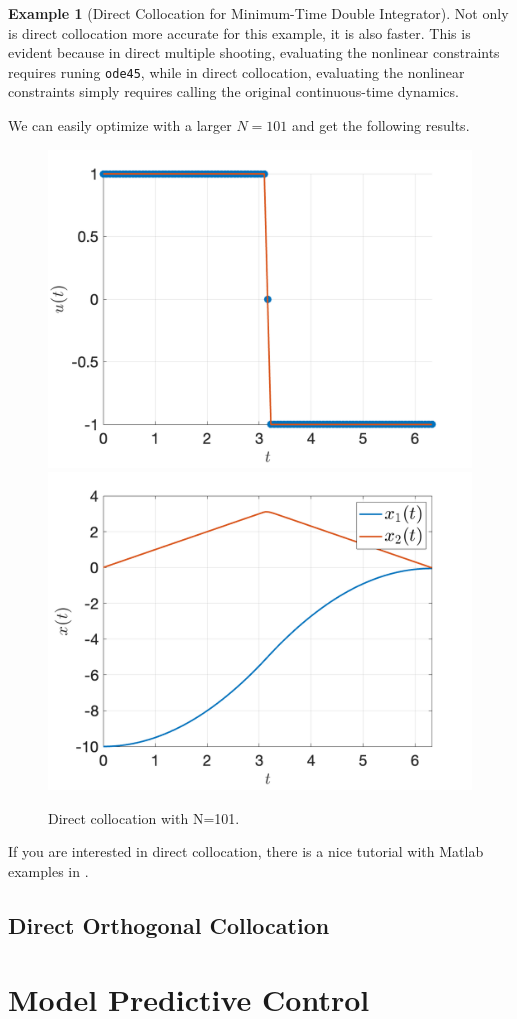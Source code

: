 \documentclass[
]{book}
\theoremstyle{definition}
\theoremstyle{definition}
\newtheorem{example}{Example}[chapter]
\theoremstyle{definition}
\theoremstyle{definition}
\theoremstyle{remark}
\begin{document}
\begin{example}[Direct Collocation for Minimum-Time Double Integrator]
Not only is direct collocation more accurate for this example, it is also faster. This is evident because in direct multiple shooting, evaluating the nonlinear constraints requires runing \texttt{ode45}, while in direct collocation, evaluating the nonlinear constraints simply requires calling the original continuous-time dynamics.

We can easily optimize with a larger \(N=101\) and get the following results.

\begin{figure}

{\centering \includegraphics[width=0.45\linewidth]{images/min_time_di_u_collocation_N_100} \includegraphics[width=0.45\linewidth]{images/min_time_di_x_collocation_N_100} 

}

\caption{Direct collocation with N=101.}\label{fig:min-time-di-u-x-collocation-N-100}
\end{figure}

\end{example}

If you are interested in direct collocation, there is a nice tutorial with Matlab examples in \citep{kelly17siam-trajopt}.

\hypertarget{direct-orthogonal-collocation}{%
\subsection{Direct Orthogonal Collocation}\label{direct-orthogonal-collocation}}

\hypertarget{model-predictive-control}{%
\section{Model Predictive Control}\label{model-predictive-control}}
\end{document}
